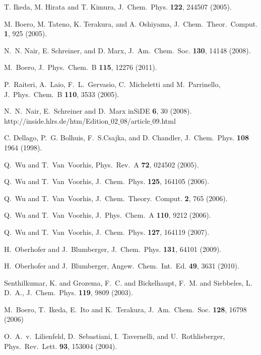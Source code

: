 \documentclass[twoside,10pt,titlepage,a4paper]{article}
\begin{document}
\begin{thebibliography}{999}
 T. Ikeda, M. Hirata and T. Kimura,
      J.~Chem.~Phys. {\bf 122}, 244507 (2005).

 M. Boero, M. Tateno, K. Terakura, and A. Oshiyama,
     J.~Chem.~Theor.~Comput. {\bf 1}, 925 (2005).

 N.~N. Nair, E. Schreiner, and D. Marx,
     J.~Am.~Chem.~Soc. {\bf 130}, 14148 (2008).

 M.~Boero, J.~Phys.~Chem.~B {\bf 115}, 12276 (2011).

 P.~Raiteri, A.~Laio, F.~L.~Gervasio, C.~Micheletti and M.~Parrinello,
      J.~Phys.~Chem.~B {\bf 110}, 3533 (2005).

 N.~N.~Nair, E.~Schreiner and D.~Marx
      inSiDE {\bf 6}, 30 (2008).\\
      http://inside.hlrs.de/htm/Edition$\_02\_08$/article$\_09$.html

 C. Dellago, P.~G. Bolhuis, F.~S.Csajka, and D. Chandler,
      J.~Chem.~Phys. {\bf 108} 1964 (1998).

    Q.~Wu and T.~{Van~Voorhis},
    Phys.~Rev.~A     {\bf 72}, 024502 (2005).

    Q.~Wu and T.~{Van~Voorhis},
    J.~Chem.~Phys.  {\bf 125}, 164105 (2006).

    Q.~Wu and T.~{Van~Voorhis},
    J.~Chem.~Theory.~Comput. {\bf 2}, 765 (2006).

    Q.~Wu and T.~{Van~Voorhis},
    J.~Phys.~Chem.~A  {\bf 110}, 9212 (2006).

    Q.~Wu and T.~{Van~Voorhis},
    J.~Chem.~Phys.    {\bf 127}, 164119 (2007).

    H.~Oberhofer and J.~Blumberger,
    J.~Chem.~Phys. {\bf 131}, 64101 (2009).

    H.~Oberhofer and J.~Blumberger,
    Angew.~Chem.~Int.~Ed. {\bf 49}, 3631 (2010).

    Senthilkumar, K. and Grozema, F.~C. and Bickelhaupt, F.~M. and Siebbeles, L. D.~A.,
    J.~Chem.~Phys. {\bf 119}, 9809 (2003).

    M.~Boero, T.~Ikeda, E.~Ito and K.~Terakura,
    J.~Am.~Chem.~Soc. {\bf 128}, 16798 (2006)

    O.~A.~v.~Lilienfeld, D.~Sebastiani, I.~Tavernelli, and U.~Rothlisberger,
    Phys.~Rev.~Lett. {\bf 93}, 153004 (2004).


\end{thebibliography}
\end{document}
